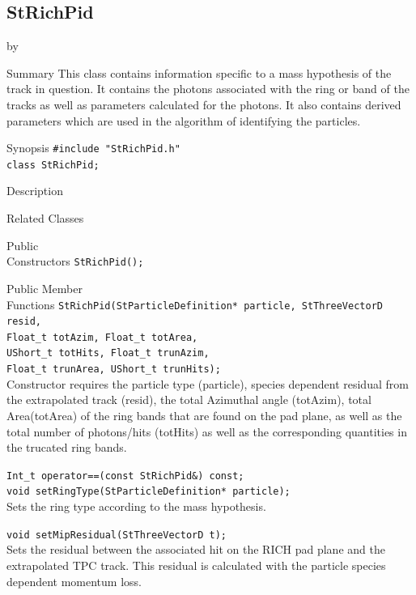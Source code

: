 \documentclass[twoside]{article}
\newcommand{\entrylabel}[1]{\mbox{\textbf{{#1}}}\hfil}%
\newenvironment{entry}
{\begin{list}{}%
    {\renewcommand{\makelabel}{\entrylabel}%
     \setlength{\labelwidth}{90pt}%
     \setlength{\leftmargin}{\labelwidth}
     \advance\leftmargin by \labelsep%
      }%
    }%
  {\end{list}}
\newcommand{\Entrylabel}[1]%
{\raisebox{0pt}[1ex][0pt]{\makebox[\labelwidth][l]%
    {\parbox[t]{\labelwidth}{\hspace{0pt}\textbf{{#1}}}}}}
\newenvironment{Entry}%
{\renewcommand{\entrylabel}{\Entrylabel}\begin{entry}}%
  {\end{entry}}
\begin{document}
\clearpage

\subsection{StRichPid}
\label{sec:StRichPid}
\begin{Entry}
\item[Summary] This class contains information specific
    to a mass hypothesis of the track in question.  It
    contains the photons associated with the ring or
    band of the tracks as well as parameters calculated
    for the photons.  It also contains derived parameters
    which are used in the algorithm of identifying the
    particles.
\item[Synopsis]
    \verb+#include "StRichPid.h"+\\
    \verb+class StRichPid;+\\
\item[Description]
\item[Related Classes]
\item[Public\\ Constructors]
    \verb+StRichPid();+\\
\item[Public Member\\ Functions]
    \verb+StRichPid(StParticleDefinition* particle, StThreeVectorD resid,+\\
    \verb+Float_t totAzim, Float_t totArea,+\\
    \verb+UShort_t totHits, Float_t trunAzim,+\\
    \verb+Float_t trunArea, UShort_t trunHits);+\\
    Constructor requires the particle type (particle),
    species dependent residual from the extrapolated
    track (resid), the total Azimuthal angle (totAzim),
    total Area(totArea) of the ring bands that are found
    on the pad plane, as well as the total number of
    photons/hits (totHits) as well as the corresponding
    quantities in the trucated ring bands.

    \verb+Int_t operator==(const StRichPid&) const;+\\

    \verb+void setRingType(StParticleDefinition* particle);+\\
    Sets the ring type according to the mass hypothesis.
    
    \verb+void setMipResidual(StThreeVectorD t);+\\
    Sets the residual between the associated hit on the
    RICH pad plane and the extrapolated TPC track.  This
    residual is calculated with the particle species dependent
    momentum loss.
    

\end{Entry}
\end{document}
